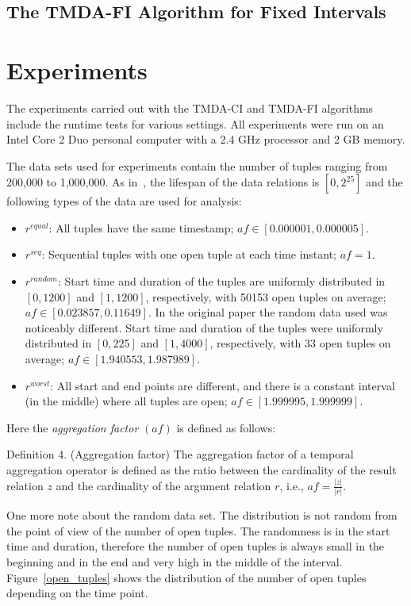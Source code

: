 \documentclass[a4paper,11pt]{article}
\begin{document}
  
\subsection{The TMDA-FI Algorithm for Fixed Intervals}





\section{Experiments}

The experiments carried out with the TMDA-CI and TMDA-FI algorithms include the runtime tests for various settings. All experiments were run on an Intel Core 2 Duo personal computer with a 2.4 GHz processor and 2 GB memory.

The data sets used for experiments contain the number of tuples ranging from 200,000 to 1,000,000. As in~\cite{bohlen}, the lifespan of the data relations is $[0,2^{25}]$ and the following types of the data are used for analysis:
\begin{itemize}
\item
$r^{equal}$: All tuples have the same timestamp; $af \in [0.000001, 0.000005]$.
\item
$r^{seq}$: Sequential tuples with one open tuple at each time instant; $af=1$.
\item
$r^{random}$: Start time and duration of the tuples are uniformly distributed in $[0,1200]$ and $[1,1200]$, respectively, with 50153 open tuples on average; $af \in [0.023857, 0.11649]$. In the original paper the random data used was noticeably different. Start time and duration of the tuples were uniformly distributed in $[0,225]$ and $[1,4000]$, respectively, with 33 open tuples on average; $af \in [1.940553, 1.987989]$.
\item
$r^{worst}$: All start and end points are different, and there is a constant interval (in the
middle) where all tuples are open; $af \in [1.999995, 1.999999]$.
\end{itemize}

Here the \textit{aggregation factor} $(af)$ is defined as follows:

Definition 4. (Aggregation factor) The aggregation factor of a temporal aggregation operator is defined as the ratio between the cardinality of the result relation $z$ and the cardinality of the argument relation $r$, i.e., $af = \frac{|z|}{|r|}$.

One more note about the random data set. The distribution is not random from the point of view of the number of open tuples. The randomness is in the start time and duration, therefore the number of open tuples is always small in the beginning and in the end and very high in the middle of the interval. Figure~\ref{open_tuples} shows the distribution of the number of open tuples depending on the time point. 
\end{document}
